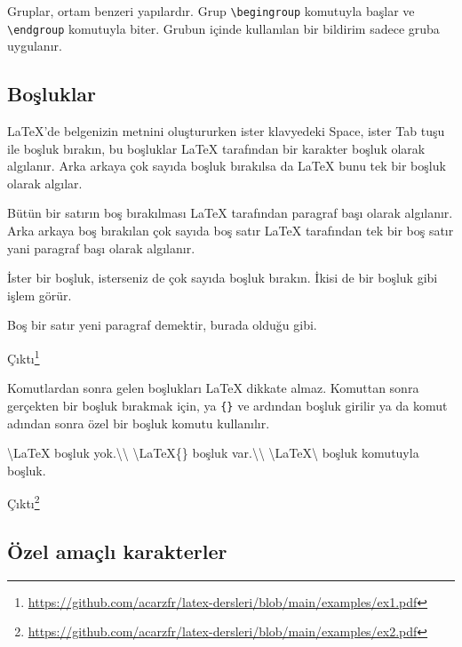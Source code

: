 \documentclass[
  10pt,
]{scrbook}
\newenvironment{Shaded}{\begin{snugshade}}{\end{snugshade}}
\newcommand{\NormalTok}[1]{#1}
\renewcommand{\href}[2]{#2\footnote{\url{#1}}}
\begin{document}
Gruplar, ortam benzeri yapılardır. Grup \texttt{\textbackslash{}begingroup} komutuyla başlar
ve \texttt{\textbackslash{}endgroup} komutuyla biter. Grubun içinde kullanılan bir bildirim
sadece gruba uygulanır.

\hypertarget{bosluk}{%
\subsection{Boşluklar}\label{bosluk}}

LaTeX'de belgenizin metnini oluştururken ister klavyedeki Space, ister
Tab tuşu ile boşluk bırakın, bu boşluklar LaTeX tarafından bir karakter
boşluk olarak algılanır. Arka arkaya çok sayıda boşluk bırakılsa da
LaTeX bunu tek bir boşluk olarak algılar.

Bütün bir satırın boş bırakılması LaTeX tarafından paragraf başı olarak
algılanır. Arka arkaya boş bırakılan çok sayıda boş satır LaTeX
tarafından tek bir boş satır yani paragraf başı olarak algılanır.

\begin{Shaded}
\begin{Highlighting}[]
\NormalTok{ İster bir boşluk, isterseniz de çok         sayıda boşluk bırakın. }
\NormalTok{İkisi de bir boşluk gibi işlem görür. }

\NormalTok{Boş bir satır yeni paragraf demektir, burada olduğu gibi.}
\end{Highlighting}
\end{Shaded}

\href{https://github.com/acarzfr/latex-dersleri/blob/main/examples/ex1.pdf}{Çıktı}

Komutlardan sonra gelen boşlukları LaTeX dikkate almaz. Komuttan sonra
gerçekten bir boşluk bırakmak için, ya \texttt{\{\}} ve ardından boşluk girilir
ya da komut adından sonra özel bir boşluk komutu kullanılır.

\begin{Shaded}
\begin{Highlighting}[]
\NormalTok{\textbackslash{}LaTeX  boşluk yok.\textbackslash{}\textbackslash{}}
\NormalTok{\textbackslash{}LaTeX\{\} boşluk var.\textbackslash{}\textbackslash{}}
\NormalTok{\textbackslash{}LaTeX\textbackslash{} boşluk komutuyla  boşluk.}
\end{Highlighting}
\end{Shaded}

\href{https://github.com/acarzfr/latex-dersleri/blob/main/examples/ex2.pdf}{Çıktı}

\hypertarget{uxf6zel-amauxe7lux131-karakterler}{%
\subsection{Özel amaçlı karakterler}\label{uxf6zel-amauxe7lux131-karakterler}}
\end{document}
